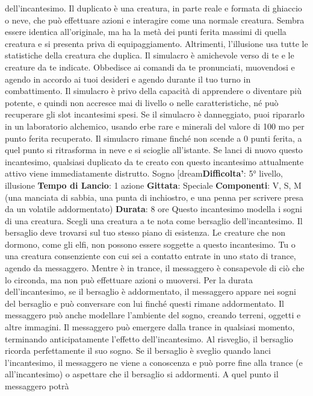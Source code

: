 \begin{multicols}{2}
dell’incantesimo. Il duplicato è una creatura, in parte
reale e formata di ghiaccio o neve, che può effettuare
azioni e interagire come una normale creatura. Sembra
essere identica all’originale, ma ha la metà dei punti
ferita massimi di quella creatura e si presenta priva di
equipaggiamento. Altrimenti, l’illusione usa tutte le
statistiche della creatura che duplica.
Il simulacro è amichevole verso di te e le creature da te
indicate. Obbedisce ai comandi da te pronunciati,
muovendosi e agendo in accordo ai tuoi desideri e
agendo durante il tuo turno in combattimento. Il
simulacro è privo della capacità di apprendere o
diventare più potente, e quindi non accresce mai di
livello o nelle caratteristiche, né può recuperare gli slot
incantesimi spesi.
Se il simulacro è danneggiato, puoi ripararlo in un
laboratorio alchemico, usando erbe rare e minerali del
valore di 100 mo per punto ferita recuperato. Il
simulacro rimane finché non scende a 0 punti ferita, a
quel punto si ritrasforma in neve e si scioglie all’istante.
Se lanci di nuovo questo incantesimo, qualsiasi
duplicato da te creato con questo incantesimo
attualmente attivo viene immediatamente distrutto.
Sogno
[dream\textbf{Difficolta'}:
5° livello, illusione
\textbf{Tempo di Lancio}: 1 azione
\textbf{Gittata}: Speciale
\textbf{Componenti}: V, S, M (una manciata di sabbia, una
punta di inchiostro, e una penna per scrivere presa da
un volatile addormentato)
\textbf{Durata}: 8 ore
Questo incantesimo modella i sogni di una creatura.
Scegli una creatura a te nota come bersaglio
dell’incantesimo. Il bersaglio deve trovarsi sul tuo
stesso piano di esistenza. Le creature che non
dormono, come gli elfi, non possono essere soggette a
questo incantesimo. Tu o una creatura consenziente
con cui sei a contatto entrate in uno stato di trance,
agendo da messaggero. Mentre è in trance, il
messaggero è consapevole di ciò che lo circonda, ma
non può effettuare azioni o muoversi.
Per la durata dell’incantesimo, se il bersaglio è
addormentato, il messaggero appare nei sogni del
bersaglio e può conversare con lui finché questi rimane
addormentato. Il messaggero può anche modellare
l’ambiente del sogno, creando terreni, oggetti e altre
immagini. Il messaggero può emergere dalla trance in
qualsiasi momento, terminando anticipatamente l’effetto
dell’incantesimo. Al risveglio, il bersaglio ricorda
perfettamente il suo sogno. Se il bersaglio è sveglio
quando lanci l’incantesimo, il messaggero ne viene a
conoscenza e può porre fine alla trance (e
all’incantesimo) o aspettare che il bersaglio si
addormenti. A quel punto il messaggero potrà

\end{multicols}
